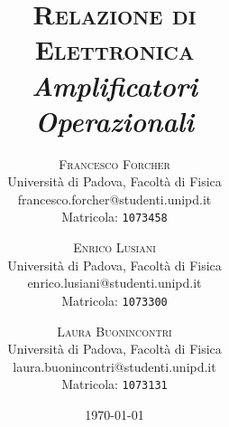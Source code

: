 \title{
\vspace{-2cm}
\fontsize{48pt}{10pt}\selectfont
\textsc{Relazione di \\[3mm] Elettronica} \\[8mm] 
\fontsize{24pt}{10pt}\selectfont
\textit{Amplificatori \\[3mm] Operazionali}
}
\author{
\large
\textsc{Francesco Forcher}\\[2mm]
\normalsize Università di Padova, Facoltà di Fisica\\
\normalsize francesco.forcher@studenti.unipd.it\\
\normalsize Matricola: \texttt{1073458}\\
\and
\large
\textsc{Enrico Lusiani}\\[2mm]
\normalsize Università di Padova, Facoltà di Fisica\\
\normalsize enrico.lusiani@studenti.unipd.it\\
\normalsize Matricola: \texttt{1073300}\\
\and
\large
\textsc{Laura Buonincontri}\\[2mm]
\normalsize Università di Padova, Facoltà di Fisica\\
\normalsize laura.buonincontri@studenti.unipd.it\\
\normalsize Matricola: \texttt{1073131}
}
\date{\today}
